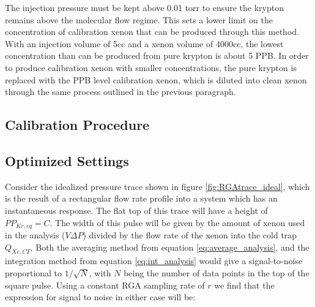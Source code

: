 \documentclass[12pt]{article}
\begin{document}
The injection pressure must be kept above 0.01 torr to ensure the krypton remains above the molecular flow regime. This sets a lower limit on the concentration of calibration xenon that can be produced through this method. With an injection volume of 5cc and a xenon volume of 4000cc, the lowest concentration than can be produced from pure krypton is about 5 PPB. In order to produce calibration xenon with smaller concentrations, the pure krypton is replaced with the PPB level calibration xenon, which is diluted into clean xenon through the same process outlined in the previous paragraph.

\subsection{Calibration Procedure}

\subsection{Optimized Settings}
Consider the idealized pressure trace shown in figure \ref{fig:RGAtrace_ideal}, which is the result of a rectangular flow rate profile into a system which has an instantaneous response. The flat top of this trace will have a height of $PP_{Kr,eq}=C$.  The width of this pulse will be given by the amount of xenon used in the analysis ($V\Delta P$) divided by the flow rate of the xenon into the cold trap $Q_{Xe,CT}$. Both the averaging method from equation \ref{eq:average_analysis}, and the integration method from equation \ref{eq:int_analysis} would give a signal-to-noise proportional to $1/\sqrt{N}$, with $N$ being the number of data points in the top of the square pulse. Using a constant RGA sampling rate of $r$ we find that the expression for signal to noise in either case will be:
\end{document}
